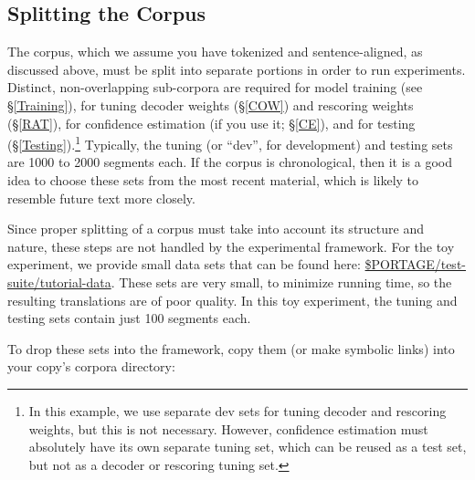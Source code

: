 \documentclass[11pt,letterpaper]{article}
\begin{document}
\subsection{Splitting the Corpus} \label{Splitting}

The corpus, which we assume you have tokenized and sentence-aligned, as
discussed above, must be split into separate portions in order to run
experiments. Distinct, non-overlapping sub-corpora are required for model
training (see \S\ref{Training}), for tuning decoder weights (\S\ref{COW}) and
rescoring weights (\S\ref{RAT}), for confidence estimation (if you use it;
\S\ref{CE}), and for testing (\S\ref{Testing}).\footnote{In this example, we
use separate dev sets for tuning decoder and rescoring weights, but this is not
necessary.  However, confidence estimation must absolutely have its own
separate tuning set, which can be reused as a test set, but not as a decoder or
rescoring tuning set.} Typically, the tuning (or ``dev'', for development) and
testing sets are 1000 to 2000 segments each.  If the corpus is chronological,
then it is a good idea to choose these sets from the most recent material,
which is likely to resemble future text more closely.

Since proper splitting of a corpus must take into account its structure
and nature, these steps are not handled by the experimental framework. For the
toy experiment, we provide small data sets that can be found here:
\url{$PORTAGE/test-suite/tutorial-data}. These sets
are very small, to minimize running time, so the resulting translations are of
poor quality. In this toy experiment, the tuning and testing sets contain
just 100 segments each.

To drop these sets into the framework, copy them (or make symbolic
links) into your copy's corpora directory:
\end{document}
